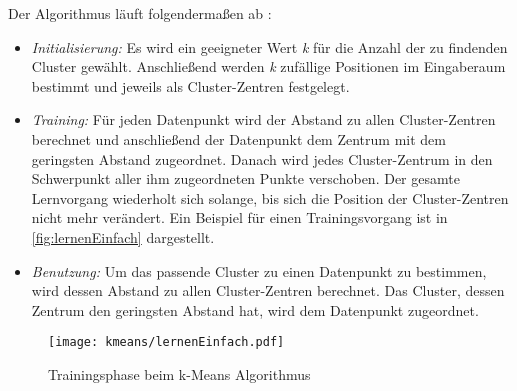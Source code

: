 Der Algorithmus läuft folgendermaßen ab \cite{Marsland}:
\begin{itemize}

\item \emph{Initialisierung:} Es wird ein geeigneter Wert \emph{k} für die Anzahl der zu findenden Cluster gewählt.
Anschließend werden \emph{k} zufällige Positionen im Eingaberaum bestimmt und jeweils als Cluster-Zentren festgelegt.
\item \emph{Training:} Für jeden Datenpunkt wird der Abstand zu allen Cluster-Zentren berechnet und anschließend der Datenpunkt dem Zentrum mit dem geringsten Abstand zugeordnet. 
Danach wird jedes Cluster-Zentrum in den Schwerpunkt aller ihm zugeordneten Punkte verschoben.
Der gesamte Lernvorgang wiederholt sich solange, bis sich die Position der Cluster-Zentren nicht mehr verändert. 
Ein Beispiel für einen Trainingsvorgang ist in \autoref{fig:lernenEinfach} dargestellt.
\item \emph{Benutzung:} Um das passende Cluster zu einen Datenpunkt zu bestimmen, wird dessen Abstand zu allen Cluster-Zentren berechnet. Das Cluster, dessen Zentrum den geringsten Abstand hat, wird dem Datenpunkt zugeordnet.
\end{itemize}


\begin{figure*}[htbp]
    \centering
   \texttt{[image: kmeans/lernenEinfach.pdf]}
\caption{Trainingsphase beim k-Means Algorithmus}
\label{fig:lernenEinfach}
\end{figure*}



